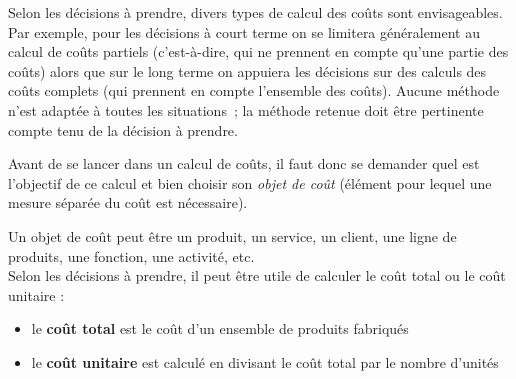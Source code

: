 \documentclass{tufte-handout}
\begin{document}
Selon les décisions à prendre, divers types de calcul des coûts sont envisageables. Par exemple, pour les décisions à court terme on se limitera généralement au calcul de coûts partiels (c'est-à-dire, qui ne prennent en compte qu'une partie des coûts) alors que sur le long terme on appuiera les décisions sur des calculs des coûts complets (qui prennent en compte l'ensemble des coûts). Aucune méthode n'est adaptée à toutes les situations ; la méthode retenue doit être pertinente compte tenu de la décision à prendre.\\
\begin{warning}
Avant de se lancer dans un calcul de coûts, il faut donc se demander quel est l'objectif de ce calcul et bien choisir son \emph{objet de coût} (élément pour lequel une mesure séparée du coût est nécessaire).\\
\end{warning}
Un objet de coût peut être un produit, un service, un client, une ligne de produits, une fonction, une activité, etc.\\

Selon les décisions à prendre, il peut être utile de calculer le coût total ou le coût unitaire :\\
\begin{itemize}
\item le \textbf{coût total} est le coût d'un ensemble de produits fabriqués\\
\item le \textbf{coût unitaire} est calculé en divisant le coût total par le nombre d'unités\\
\end{itemize}
\end{document}
